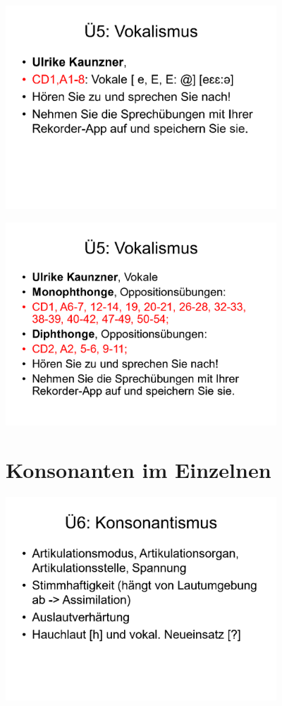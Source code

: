 \documentclass[
  letterpaper,
]{scrbook}
\begin{document}
\includegraphics[width=4in,height=\textheight]{./pictures/sprachlabor/Phonetikuebungen_S01_Page19.png}

\includegraphics[width=4in,height=\textheight]{./pictures/sprachlabor/Phonetikuebungen_S01_Page20.png}

\hypertarget{sec-konsonanten}{%
\chapter{Konsonanten im Einzelnen}\label{sec-konsonanten}}

\includegraphics[width=4in,height=\textheight]{./pictures/sprachlabor/Phonetikuebungen_S01_Page21.png}
\end{document}
